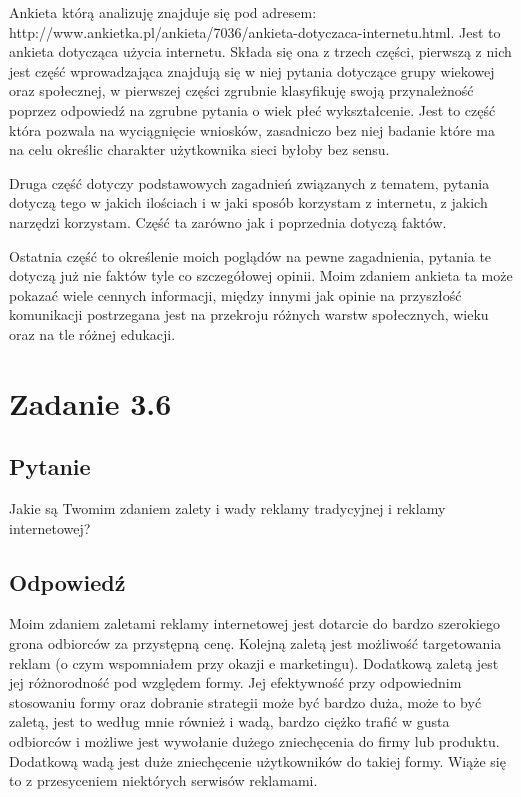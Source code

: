 \documentclass[paper=a4, fontsize=11pt]{scrartcl} %
\numberwithin{equation}{section} %
\numberwithin{figure}{section} %
\numberwithin{table}{section} %
\begin{document}
Ankieta którą analizuję znajduje się pod adresem: http://www.ankietka.pl/ankieta/7036/ankieta-dotyczaca-internetu.html.
Jest to ankieta dotycząca użycia internetu. Składa się ona z trzech części, pierwszą z nich jest część wprowadzająca
znajdują się w niej pytania dotyczące grupy wiekowej oraz społecznej, w pierwszej części zgrubnie klasyfikuję swoją przynależność
poprzez odpowiedź na zgrubne pytania o wiek płeć wykształcenie. Jest to część która pozwala na wyciągnięcie wniosków, zasadniczo
bez niej badanie które ma na celu określic charakter użytkownika sieci byłoby bez sensu.

Druga część dotyczy podstawowych zagadnień związanych z tematem, pytania dotyczą tego w jakich ilościach i w jaki sposób korzystam
z internetu, z jakich narzędzi korzystam. Część ta zarówno jak i poprzednia dotyczą faktów.

Ostatnia część to określenie moich poglądów na pewne zagadnienia, pytania te dotyczą już nie faktów tyle co szczegółowej opinii.
Moim zdaniem ankieta ta może pokazać wiele cennych informacji, między innymi jak opinie na przyszłość komunikacji postrzegana
jest na przekroju różnych warstw społecznych, wieku oraz na tle różnej edukacji.

\section{Zadanie 3.6}

\subsection {Pytanie}

Jakie są Twomim zdaniem zalety i wady reklamy tradycyjnej i reklamy internetowej?

\subsection {Odpowiedź}

Moim zdaniem zaletami reklamy internetowej jest dotarcie do bardzo szerokiego grona odbiorców za przystępną cenę.
Kolejną zaletą jest możliwość targetowania reklam (o czym wspomniałem przy okazji e marketingu).
Dodatkową zaletą jest jej różnorodność pod względem formy.
Jej efektywność przy odpowiednim stosowaniu formy oraz dobranie strategii może być bardzo duża, może to być zaletą,
jest to według mnie również i wadą, bardzo ciężko trafić w gusta odbiorców i możliwe jest wywołanie dużego zniechęcenia
do firmy lub produktu.
Dodatkową wadą jest duże zniechęcenie użytkowników do takiej formy. Wiąże się to z przesyceniem niektórych serwisów
reklamami.
\end{document}
